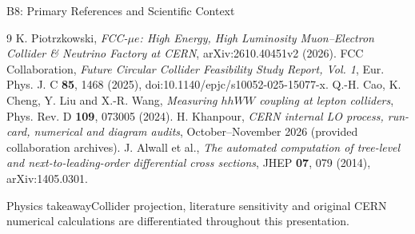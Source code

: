 \documentclass[aspectratio=1610,english]{beamer}
\newcommand{\src}[1]{\vfill{\par\color{black!65}\fontsize{6.4}{7.4}\selectfont\emph{Source:} #1\par}}
\newcommand{\key}[1]{\begin{alertblock}{Physics takeaway}\scriptsize #1\end{alertblock}}
\begin{document}
\begin{frame}[t]{B8: Primary References and Scientific Context}
\scriptsize

\begin{thebibliography}{9}\scriptsize
{} K. Piotrzkowski, \emph{FCC-$\mu e$: High Energy, High Luminosity Muon--Electron Collider \& Neutrino Factory at CERN}, arXiv:2610.40451v2 (2026).
 FCC Collaboration, \emph{Future Circular Collider Feasibility Study Report, Vol. 1}, Eur. Phys. J. C \textbf{85}, 1468 (2025), doi:10.1140/epjc/s10052-025-15077-x.
 Q.-H. Cao, K. Cheng, Y. Liu and X.-R. Wang, \emph{Measuring $hhWW$ coupling at lepton colliders}, Phys. Rev. D \textbf{109}, 073005 (2024).
 H. Khanpour, \emph{CERN internal LO process, run-card, numerical and diagram audits}, October--November 2026 (provided collaboration archives).
 J. Alwall et al., \emph{The automated computation of tree-level and next-to-leading-order differential cross sections}, JHEP \textbf{07}, 079 (2014), arXiv:1405.0301.
\end{thebibliography}
\key{Collider projection, literature sensitivity and original CERN numerical calculations are differentiated throughout this presentation.}


\end{frame}
\end{document}
